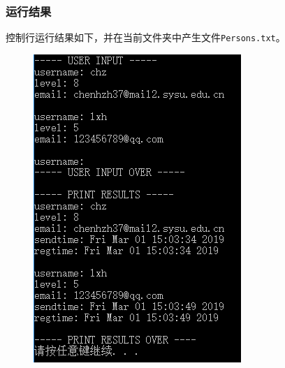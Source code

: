 \documentclass[logo,reportComp]{thesis}
\begin{document}
\subsubsection{运行结果}
控制行运行结果如下，并在当前文件夹中产生文件\verb'Persons.txt'。
\begin{figure}[H]
\centering
\includegraphics[width=0.4\linewidth]{fig/person.PNG}
\end{figure}
\end{document}
